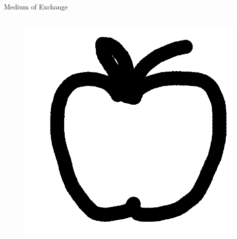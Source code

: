 \documentclass[]{beamer}
\begin{document}
\begin{frame}{Medium of Exchange}
\begin{columns}
\begin{column}{0.5\textwidth}
\begin{figure}
\begin{center}
					\includegraphics[width = 0.1\textheight]{../assets/images/apple}
				\end{center}
			\end{figure}
		\end{column}
	\end{columns}
	\vspace{1.5em}
	\begin{columns}[T]
		\begin{column}{0.5\textwidth}
\end{column}
\end{columns}
\end{frame}
\end{document}

